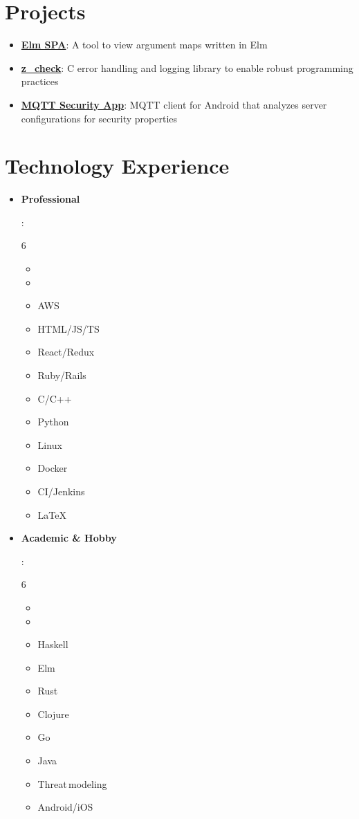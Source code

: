 \documentclass[letterpaper,11pt]{article}
\newcommand{\resumeItem}[2]{
  \item\small{
    \textbf{#1}{: #2 \vspace{-2pt}}
  }
}
\newcommand{\resumeSubItem}[2]{\resumeItem{#1}{#2}\vspace{-4pt}}
\newcommand{\resumeSubHeadingListStart}{\begin{itemize}[leftmargin=*]}
\newcommand{\resumeSubHeadingListEnd}{\end{itemize}}
\newcommand{\resumeListMulticolStart}[1]{
  \vspace{-2.4em}
  \setlength{\columnsep}{-1pc}
  \begin{multicols}{#1}
    \begin{itemize}[label={}]
      \item
}
\newcommand{\resumeListMulticolEnd}{
    \end{itemize}
  \end{multicols}
  \vspace{-10pt}
}
\begin{document}
\section{Projects}
  \resumeSubHeadingListStart
    \resumeSubItem{\href{https://kkredit.github.io/arg-viewer/}{Elm SPA}}
      {A tool to view argument maps written in Elm}
    \resumeSubItem{\href{https://github.com/kkredit/z_check}{z\_check}}
      {C error handling and logging library to enable robust programming practices}
    \resumeSubItem{\href{https://github.com/kkredit/MQTT-sweeper-android}{MQTT Security App}}
      {MQTT client for Android that analyzes server configurations for security properties}
  \resumeSubHeadingListEnd


\section{Technology Experience}
  \resumeSubHeadingListStart

  \resumeSubItem{Professional}
    {
      \resumeListMulticolStart{6}
        \item %
        \item AWS
        \item HTML/JS/TS
        \item React/Redux
        \item Ruby/Rails
        \item C/C++
        \item Python
        \item Linux
        \item Docker
        \item CI/Jenkins
        \item \LaTeX
      \resumeListMulticolEnd
    }
  \resumeSubItem{Academic \& Hobby}
    {
      \resumeListMulticolStart{6}
        \item %
        \item Haskell
        \item Elm
        \item Rust
        \item Clojure
        \item Go
        \item Java
        \item Threat\,modeling
        \item Android/iOS
      \resumeListMulticolEnd
    }
  \resumeSubHeadingListEnd
\end{document}
